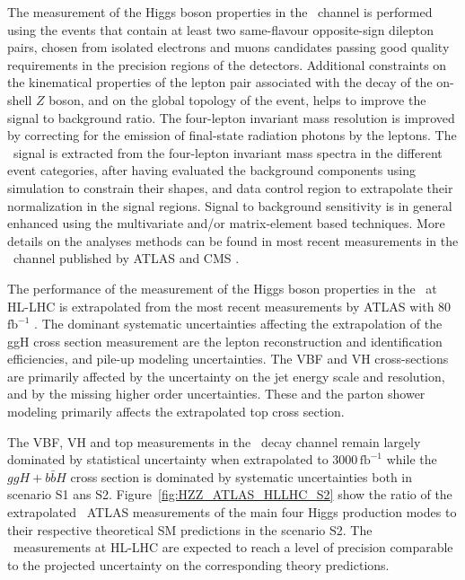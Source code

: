 The measurement of the Higgs boson properties in the \HZZ\ channel is performed using the events that contain at least two same-flavour opposite-sign dilepton pairs, chosen from isolated electrons and muons candidates passing good quality requirements in the precision regions of the detectors. Additional constraints on the kinematical properties of the lepton pair associated with the decay of the on-shell $Z$ boson, and on the global topology of the event, helps to improve the signal to background ratio. The four-lepton invariant mass resolution is improved by correcting for the emission of final-state radiation photons by the leptons.
The \HZZ\ signal is extracted from the four-lepton invariant mass spectra in the different event categories, after having evaluated the background components using simulation to constrain their shapes, and data control region to extrapolate their normalization in the signal regions. Signal to background sensitivity is in general enhanced using the multivariate and/or matrix-element based techniques. More details on the analyses methods can be found in most recent measurements in the \HZZ\ channel published by ATLAS \cite{ATLAS:2018bsg} and CMS \cite{Sirunyan:2017exp}.

The performance of the measurement of the Higgs boson properties in the \HZZ\ at HL-LHC is extrapolated from the most recent measurements by ATLAS with 80\,$\mathrm{fb}^{-1}$ \cite{ATLAS:2018bsg}. The dominant systematic uncertainties affecting the extrapolation of the ggH cross section measurement are the lepton reconstruction and identification efficiencies, and pile-up modeling uncertainties. The VBF and VH cross-sections are primarily affected by the uncertainty on the jet energy scale and resolution, and by the
missing higher order uncertainties.
These and
the parton shower modeling primarily affects the extrapolated top cross section.

The VBF, VH and top measurements in the \HZZ\ decay channel remain largely dominated by statistical uncertainty when extrapolated to 3000\,$\mathrm{fb}^{-1}$ while the $ggH+b\bar{b}H$ cross section is dominated by systematic uncertainties both in scenario S1 ans S2.
%
Figure~\ref{fig:HZZ_ATLAS_HLLHC_S2} show the ratio of the extrapolated \HZZ\ ATLAS measurements of the main four Higgs production modes to their respective theoretical SM predictions in the scenario S2. The  \HZZ\ measurements at HL-LHC are expected to  reach a level of precision comparable to the projected uncertainty on the corresponding theory predictions.


